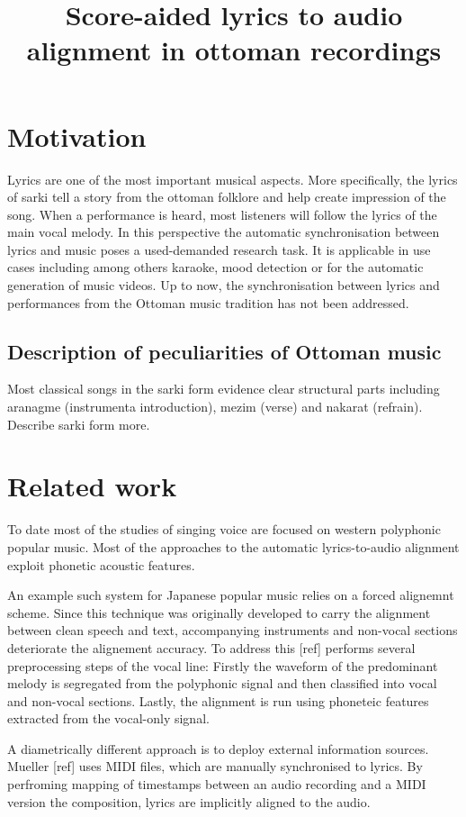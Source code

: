 \documentclass{article}
\title{Score-aided lyrics to audio alignment in ottoman recordings}
\begin{document}
%
\maketitle
%


\section{Motivation}
Lyrics are one of the most important musical aspects. More specifically, the lyrics of sarki tell a story from the ottoman folklore and help create impression of the song. When a performance is heard, most listeners will follow the lyrics of the main vocal melody.   
In this perspective the automatic synchronisation between lyrics and music poses a used-demanded research task. It is applicable in use cases including among others karaoke, mood detection or for the automatic generation of music videos.
Up to now, the synchronisation between lyrics and performances from the Ottoman music tradition has not been addressed. 

\subsection{Description of peculiarities of Ottoman music}
Most classical songs in the sarki form evidence clear structural parts including aranagme (instrumenta introduction), mezim (verse) and nakarat (refrain).
Describe sarki form more.

\section{Related work}
To date most of the studies of singing voice are focused on western polyphonic popular music. Most of the approaches to the automatic lyrics-to-audio alignment exploit phonetic acoustic features. 

An example such system for Japanese popular music \citep{fujihara2011lyricsynchronizer}
relies on a forced alignemnt scheme.  Since this technique was originally developed to carry the alignment between clean speech and text, accompanying instruments and non-vocal sections deteriorate the alignement accuracy. To address this [ref] performs several preprocessing steps of the vocal line: Firstly the waveform of the predominant melody is segregated from the polyphonic signal and then classified into vocal and non-vocal sections. Lastly, the alignment is run using phoneteic features extracted from the vocal-only signal.   

A diametrically different approach is to deploy external information sources. Mueller [ref] uses MIDI files, which are manually synchronised to lyrics. By perfroming mapping of timestamps between an audio recording and a MIDI version the composition, lyrics are  implicitly aligned to the audio.
\end{document}
